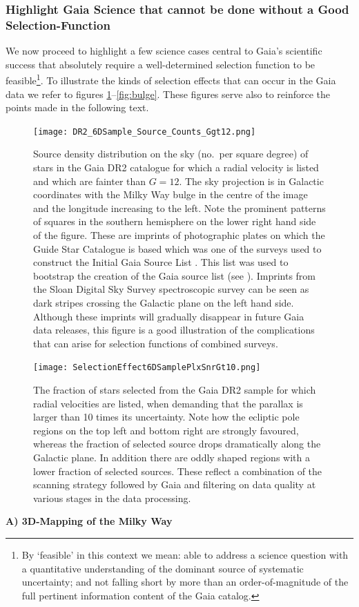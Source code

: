 \subsubsection{Highlight Gaia Science that cannot be done without a Good Selection-Function}
We now proceed to highlight a few science cases central to Gaia's scientific success that absolutely require a well-determined selection function to be feasible\footnote{By `feasible' in this context we mean: able to address a science question with a quantitative understanding of the dominant source of systematic uncertainty; and not falling short by more than an order-of-magnitude of the full pertinent information content of the Gaia catalog.}.
To illustrate the kinds of selection effects that can occur in the Gaia data we refer to figures \ref{fig:6dsample}--\ref{fig:bulge}. These figures serve also to reinforce the points made in the following text.
\\

\begin{figure}
    \centering
    \texttt{[image: DR2\_6DSample\_Source\_Counts\_Ggt12.png]}
    \caption{Source density distribution on the sky (no.\ per square degree) of stars in the Gaia DR2 catalogue for which a radial velocity is listed and which are fainter than $G=12$. The sky projection is in Galactic coordinates with the Milky Way bulge in the centre of the image and the longitude increasing to the left. Note the prominent patterns of squares in the southern hemisphere on the lower right hand side of the figure. These are imprints of photographic plates on which the Guide Star Catalogue is based which was one of the surveys used to construct the Initial Gaia Source List \cite{2014A&A...570A..87S}. This list was used to bootstrap the creation of the Gaia source list (see ). Imprints from the Sloan Digital Sky Survey spectroscopic survey can be seen as dark stripes crossing the Galactic plane on the left hand side. Although these imprints will gradually disappear in future Gaia data releases, this figure is a good illustration of the complications that can arise for selection functions of combined surveys.}
    \label{fig:6dsample}
\end{figure}

\begin{figure}
    \centering
    \texttt{[image: SelectionEffect6DSamplePlxSnrGt10.png]}
    \caption{The fraction of stars selected from the Gaia DR2 sample for which radial velocities are listed, when demanding that the parallax is larger than 10 times its uncertainty. Note how the ecliptic pole regions on the top left and bottom right are strongly favoured, whereas the fraction of selected source drops dramatically along the Galactic plane. In addition there are oddly shaped regions with a lower fraction of selected sources. These reflect a combination of the scanning strategy followed by Gaia and filtering on data quality at various stages in the data processing.}
    \label{fig:6dplxsnrgt10}
\end{figure}
\noindent\textbf{A) 3D-Mapping of the Milky Way}

